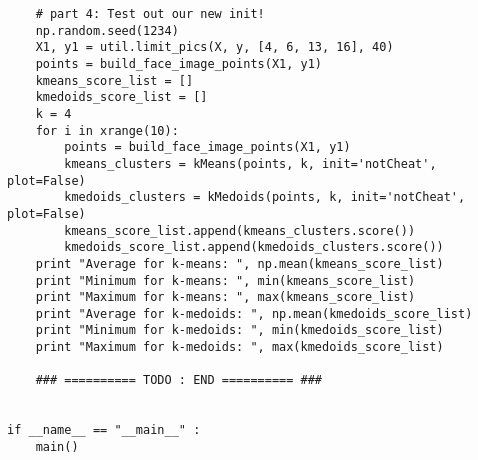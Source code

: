 \documentclass[11pt]{article}
\begin{document}
\begin{verbatim}
    # part 4: Test out our new init!
    np.random.seed(1234)
    X1, y1 = util.limit_pics(X, y, [4, 6, 13, 16], 40)
    points = build_face_image_points(X1, y1)
    kmeans_score_list = []
    kmedoids_score_list = []
    k = 4
    for i in xrange(10):
        points = build_face_image_points(X1, y1)
        kmeans_clusters = kMeans(points, k, init='notCheat', plot=False)
        kmedoids_clusters = kMedoids(points, k, init='notCheat', plot=False) 
        kmeans_score_list.append(kmeans_clusters.score())
        kmedoids_score_list.append(kmedoids_clusters.score())
    print "Average for k-means: ", np.mean(kmeans_score_list)
    print "Minimum for k-means: ", min(kmeans_score_list)
    print "Maximum for k-means: ", max(kmeans_score_list)
    print "Average for k-medoids: ", np.mean(kmedoids_score_list)
    print "Minimum for k-medoids: ", min(kmedoids_score_list)
    print "Maximum for k-medoids: ", max(kmedoids_score_list)
    
    ### ========== TODO : END ========== ###


if __name__ == "__main__" :
    main()
 \end{verbatim}   
 
\end{document}
